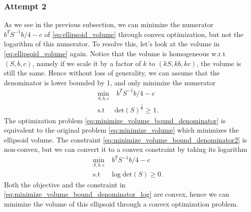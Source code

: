 \documentclass{article}
\begin{document}
\subsubsection{Attempt 2}
As we see in the previous subsection, we can minimize the numerator $b^TS^{-1}b/4-c$ of \eqref{eq:ellipsoid_volume} through convex optimization, but not the logarithm of this numerator. To resolve this, let's look at the volume in \eqref{eq:ellipsoid_volume} again. Notice that the volume is homogeneous w.r.t $(S, b, c)$, namely if we scale it by a factor of $k$ to $(kS, kb, kc)$, the volume is still the same. Hence without loss of generality, we can assume that the denominator is lower bounded by 1, and only minimize the numerator
\begin{subequations}
\begin{align}
	\min_{S, b, c}&\; b^TS^{-1}b/4-c\\
	\text{s.t }& \text{det}(S)^{\frac{1}{n}}\ge 1. \label{eq:minimize_volume_bound_denominator2}
\end{align}
\label{eq:minimize_volume_bound_denominator}
\end{subequations}
The optimization problem \eqref{eq:minimize_volume_bound_denominator} is equivalent to the original problem \eqref{eq:minimize_volume} which minimizes the ellipsoid volume. The constraint \eqref{eq:minimize_volume_bound_denominator2} is non-convex, but we can convert it to a convex constraint by taking its logarithm
\begin{subequations}
\begin{align}
	\min_{S, b, c}&\; b^TS^{-1}b/4-c\\
	\text{s.t }& \log\text{det}(S)\ge 0. 
\end{align}
\label{eq:minimize_volume_bound_denominator_log}
\end{subequations}
Both the objective and the constraint in \eqref{eq:minimize_volume_bound_denominator_log} are convex, hence we can minimize the volume of this ellipsoid through a convex optimization problem.
\end{document}
